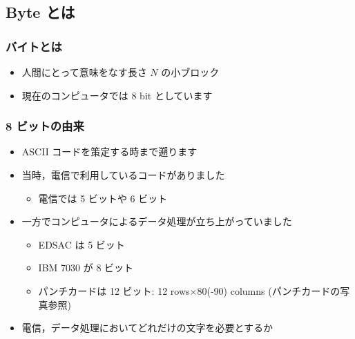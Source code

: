 \subsection{Byte とは}
\begin{frame}
\frametitle{バイトとは}
  \begin{itemize}
\item 人間にとって意味をなす長さ $N$ の小ブロック
\item 現在のコンピュータでは 8 bit としています
  \end{itemize}
\end{frame}
\begin{frame}
\frametitle{8 ビットの由来}
  \begin{itemize}
\item ASCII コードを策定する時まで遡ります
\item 当時，電信で利用しているコードがありました
    \begin{itemize}
\item 電信では 5 ビットや 6 ビット
    \end{itemize}
\item 一方でコンピュータによるデータ処理が立ち上がっていました
    \begin{itemize}
\item EDSAC は 5 ビット
\item IBM 7030 が 8 ビット
\item パンチカードは 12 ビット: 12 rows$\times$80(-90) columns (パンチカードの写真参照)
    \end{itemize}
\item 電信，データ処理においてどれだけの文字を必要とするか
  \end{itemize}
\end{frame}

